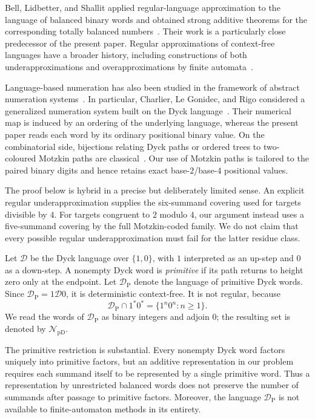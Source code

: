 \documentclass[11pt]{article}
\theoremstyle{plain}
\theoremstyle{definition}
\newcommand{\NpD}{\mathcal{N}_{\mathrm{pD}}}
\newcommand{\Dyck}{\mathcal{D}}
\newcommand{\DP}{\mathcal{D}_{\mathrm{P}}}
\begin{document}
Bell, Lidbetter, and Shallit applied regular-language approximation to the
language of balanced binary words and obtained strong additive theorems
for the corresponding totally balanced numbers~\cite{BLS}.  Their work is
a particularly close predecessor of the present paper.  Regular
approximations of context-free languages have a broader history, including
constructions of both underapproximations and overapproximations by finite
automata~\cite{Nederhof,MohriNederhof}.

Language-based numeration has also been studied in the framework of
abstract numeration systems~\cite{RigoNumeration}.  In particular,
Charlier, Le Gonidec, and Rigo considered a generalized numeration system
built on the Dyck language~\cite{CLGR}.  Their numerical map is induced by
an ordering of the underlying language, whereas the present paper reads
each word by its ordinary positional binary value.  On the combinatorial
side, bijections relating Dyck paths or ordered trees to two-coloured
Motzkin paths are classical~\cite{DeutschShapiro}.  Our use of Motzkin
paths is tailored to the paired binary digits and hence retains exact
base-$2$/base-$4$ positional values.

The proof below is hybrid in a precise but deliberately limited sense.  An
explicit regular underapproximation supplies the six-summand covering used
for targets divisible by $4$.  For targets congruent to $2$ modulo $4$, our
argument instead uses a five-summand covering by the full Motzkin-coded
family.  We do not claim that every possible regular underapproximation
must fail for the latter residue class.

Let $\Dyck$ be the Dyck language over $\{1,0\}$, with $1$ interpreted as
an up-step and $0$ as a down-step.  A nonempty Dyck word is
\emph{primitive} if its path returns to height zero only at the endpoint.
Let $\DP$ denote the language of primitive Dyck words.  Since
$\DP=1\Dyck0$, it is deterministic context-free.  It is not regular,
because
\[
 \DP\cap1^*0^*=\{1^n0^n:n\geq1\}.
\]
We read the words of $\DP$ as binary integers and adjoin $0$; the resulting
set is denoted by $\NpD$.

The primitive restriction is substantial.  Every nonempty Dyck word
factors uniquely into primitive factors, but an additive representation in
our problem requires each summand itself to be represented by a single
primitive word.  Thus a representation by unrestricted balanced words does
not preserve the number of summands after passage to primitive factors.
Moreover, the language $\DP$ is not available to finite-automaton methods
in its entirety.
\end{document}
